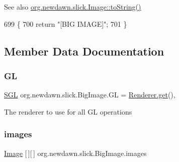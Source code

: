\begin{DoxySeeAlso}{See also}
\mbox{\hyperlink{classorg_1_1newdawn_1_1slick_1_1_image_ab61e19db4aef03043c0f0747e004e390}{org.\+newdawn.\+slick.\+Image\+::to\+String()}} 
\end{DoxySeeAlso}

\begin{DoxyCode}
699                              \{
700         \textcolor{keywordflow}{return} \textcolor{stringliteral}{"[BIG IMAGE]"};
701     \}
\end{DoxyCode}


\subsection{Member Data Documentation}
\mbox{\label{classorg_1_1newdawn_1_1slick_1_1_big_image_a8b0fd02f9b67f0a874e42e0a701ea7c2}} 
\subsubsection{\texorpdfstring{GL}{GL}}
{\footnotesize\ttfamily \mbox{\hyperlink{interfaceorg_1_1newdawn_1_1slick_1_1opengl_1_1renderer_1_1_s_g_l}{S\+GL}} org.\+newdawn.\+slick.\+Big\+Image.\+GL = \mbox{\hyperlink{classorg_1_1newdawn_1_1slick_1_1opengl_1_1renderer_1_1_renderer_abe742c3a7dfca67c6c01821d27087308}{Renderer.\+get}}()\hspace{0.3cm}{\ttfamily [static]}, {\ttfamily [protected]}}

The renderer to use for all GL operations \mbox{\label{classorg_1_1newdawn_1_1slick_1_1_big_image_a297fc524b2aef82e75e23a59c6f4102f}} 
\subsubsection{\texorpdfstring{images}{images}}
{\footnotesize\ttfamily \mbox{\hyperlink{classorg_1_1newdawn_1_1slick_1_1_image}{Image}} \mbox{[}$\,$\mbox{]}\mbox{[}$\,$\mbox{]} org.\+newdawn.\+slick.\+Big\+Image.\+images\hspace{0.3cm}{\ttfamily [private]}}

